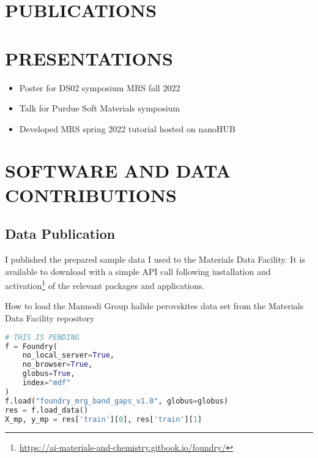 \chapter{PUBLICATIONS}
\label{sec:orgc0311fe}

\nocite{manganaris-2022-mrs-comput}
\nocite{yang-2023-high-throug}
\nocite{manganaris-2023-multi-fidel}
\nocite{gollapalli-2023-graph-neural}
\nocite{edlabadkar-2023-drivin-halid}

\printbibliography[heading=none,category=myarticles]

\chapter{PRESENTATIONS}
\label{sec:org67083c6}
\begin{itemize}
\item Poster for DS02 symposium MRS fall 2022
\item Talk for Purdue Soft Materials symposium
\item Developed MRS spring 2022 tutorial hosted on nanoHUB\autocite{manganaris-2022-mrs-comput}
\end{itemize}

\chapter{SOFTWARE AND DATA CONTRIBUTIONS}
\label{sec:org6375b29}
\section{Data Publication}
\label{sec:org4930f7a}
I published the prepared sample data I used to the Materials Data Facility.
It is available to download with a simple API call following installation and activation\footnote{\url{https://ai-materials-and-chemistry.gitbook.io/foundry/}} of the relevant packages and applications.

\begin{ZZlisting}
  \caption{\label{lst:MDF} How to load the Mannodi Group halide perovskites data set from the Materials Data Facility repository}
  \begin{CenteredBox}
    \begin{lstlisting}[language=python]
# THIS IS PENDING
f = Foundry(
    no_local_server=True,
    no_browser=True,
    globus=True,
    index="mdf"
)
f.load("foundry_mrg_band_gaps_v1.0", globus=globus)
res = f.load_data()
X_mp, y_mp = res['train'][0], res['train'][1]
    \end{lstlisting}
  \end{CenteredBox}
\end{ZZlisting}

